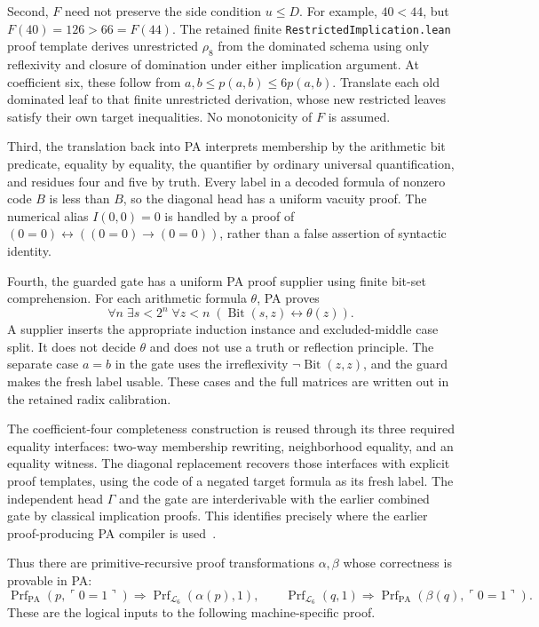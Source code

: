 \documentclass[11pt,letterpaper]{article}
\newcommand{\PA}{\mathrm{PA}}
\newcommand{\file}[1]{\nolinkurl{#1}}
\begin{document}
Second, \(F\) need not preserve the side condition \(u\le D\).
For example, \(40<44\), but \(F(40)=126>66=F(44)\).
The retained finite \file{RestrictedImplication.lean} proof template derives
unrestricted \(\rho_8\) from the dominated schema using only reflexivity and
closure of domination under either implication argument. At coefficient six,
these follow from
\(a,b\le p(a,b)\le6p(a,b)\).
Translate each old dominated leaf to that finite unrestricted derivation,
whose new restricted leaves satisfy their own target inequalities. No
monotonicity of \(F\) is assumed.

Third, the translation back into PA interprets membership by the arithmetic
bit predicate, equality by equality, the quantifier by ordinary universal
quantification, and residues four and five by truth. Every label in a decoded
formula of nonzero code \(B\) is less than \(B\), so the diagonal head has a
uniform vacuity proof. The numerical alias \(I(0,0)=0\) is handled by a proof
of \((0=0)\leftrightarrow((0=0)\to(0=0))\), rather than a false assertion of
syntactic identity.

Fourth, the guarded gate has a uniform PA proof supplier using finite bit-set
comprehension. For each arithmetic formula \(\theta\), PA proves
\[
 \forall n\;\exists s<2^n\;\forall z<n\;
       (\operatorname{Bit}(s,z)\leftrightarrow\theta(z)).
\]
A supplier inserts the appropriate induction instance and excluded-middle
case split. It does not decide \(\theta\) and does not use a truth or reflection
principle. The separate case \(a=b\) in the gate uses the irreflexivity
\(\neg\operatorname{Bit}(z,z)\), and the guard makes the fresh label usable.
These cases and the full matrices are written out in the retained radix
calibration.

The coefficient-four completeness construction is reused through its three
required equality interfaces: two-way membership rewriting, neighborhood
equality, and an equality witness. The diagonal replacement recovers those
interfaces with explicit proof templates, using the code of a negated target
formula as its fresh label. The independent head \(\Gamma\) and the gate
are interderivable with the earlier combined gate by classical implication
proofs. This identifies precisely where the earlier proof-producing PA
compiler is used~\cite{upstream,diagonal-packet,radix-packet}.

Thus there are primitive-recursive proof transformations \(\alpha,\beta\)
whose correctness is provable in PA:
\[
 \operatorname{Prf}_{\PA}(p,\ulcorner0=1\urcorner)
 \Longrightarrow\operatorname{Prf}_{\mathcal L_6}(\alpha(p),1),\qquad
 \operatorname{Prf}_{\mathcal L_6}(q,1)
 \Longrightarrow\operatorname{Prf}_{\PA}(\beta(q),\ulcorner0=1\urcorner).
\]
These are the logical inputs to the following machine-specific proof.
\end{document}
